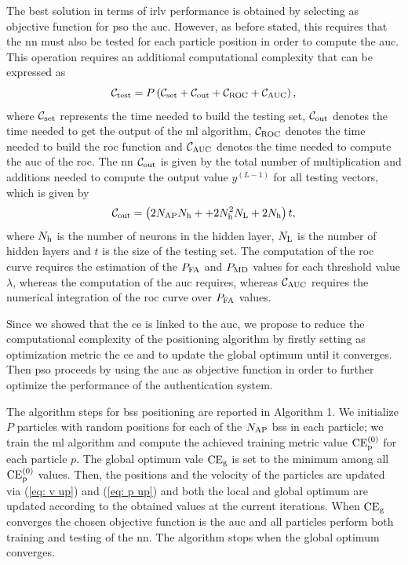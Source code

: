 \documentclass[twocolumns]{IEEEtran}
\begin{document}
The best solution in terms of \ac{irlv} performance is obtained by selecting as objective function for \ac{pso} the \ac{auc}. However, as before stated, this requires that the \ac{nn} must also be tested for each particle position in order to compute the \ac{auc}. This operation requires an additional computational complexity that can be expressed as
\begin{equation}
    \mathcal{C}_{\rm test} = P\left(\mathcal{C}_{\rm set} + \mathcal{C}_{\rm out}+\mathcal{C}_{\rm ROC}+\mathcal{C}_{\rm AUC}\right),
\end{equation}
where $\mathcal{C}_{\rm set}$ represents the time needed to build the testing set, $\mathcal{C}_{\rm out}$ denotes the time needed to get the output of the \ac{ml} algorithm, $\mathcal{C}_{\rm ROC}$ denotes the time needed to build the \ac{roc} function and $\mathcal{C}_{\rm AUC}$ denotes the time needed to compute the \ac{auc} of the \ac{roc}.
The \ac{nn} $\mathcal{C}_{\rm out}$ is given by the total number of multiplication and additions needed to compute the output value $y^{(L-1)}$ for all testing vectors, which is given by
\begin{equation}
    \mathcal{C}_{\rm out} = \left(2N_{\rm AP}N_{\rm h}++2N_{\rm h}^2N_{\rm L} + 2N_{\rm h}\right)t,
\end{equation}
where $N_{\rm h}$ is the number of neurons in the hidden layer, $N_{\rm L}$ is the number of hidden layers and $t$ is the size of the testing set.
The computation of the \ac{roc} curve requires the estimation of the $P_{\rm FA}$ and $P_{\rm MD}$ values for each threshold value $\lambda$, whereas the computation of the \ac{auc} requires, whereas $\mathcal{C}_{\rm AUC}$ requires the numerical integration of the \ac{roc} curve over $P_{\rm FA}$ values.

Since we showed that the \ac{ce} is linked to the \ac{auc}, we propose to reduce the computational complexity of the positioning algorithm by firstly setting as optimization metric the \ac{ce} and to update the global optimum until it converges. Then \ac{pso} proceeds by using the \ac{auc} as objective function in order to further optimize the performance of the authentication system.

The algorithm steps for \acp{bs} positioning are reported in Algorithm 1. We initialize $P$ particles with random positions for each of the $N_{\rm AP}$ \acp{bs} in each particle; we train the \ac{ml} algorithm and compute the achieved training metric value $\rm{CE}_p^{(0)}$ for each particle $p$. The global optimum vale $\rm{CE}_g$ is set to the minimum among all $\rm{CE}_p^{(0)}$ values. Then, the positions and the velocity of the particles are updated via (\ref{eq: v up}) and (\ref{eq: p up}) and both the local and global optimum are updated according to the obtained values at the current iterations. When $\rm{CE}_g$ converges the chosen objective function is the \ac{auc} and all particles perform both training and testing of the \ac{nn}. The algorithm stops when the global optimum converges.
\end{document}
